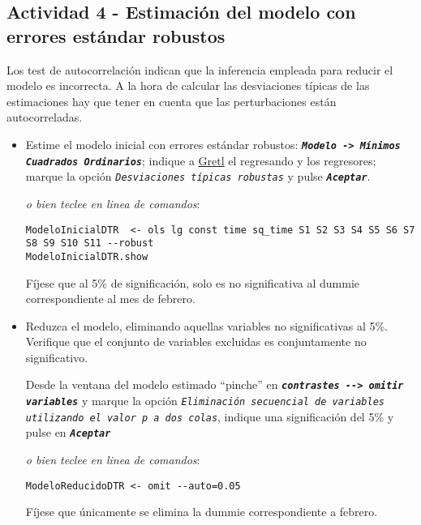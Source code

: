 \documentclass[11pt]{article}
\begin{document}
\subsection{Actividad 4 - Estimación del modelo con errores estándar robustos}
\label{sec:orge404a15}

Los test de autocorrelación indican que la inferencia empleada para
reducir el modelo es incorrecta. A la hora de calcular las
desviaciones típicas de las estimaciones hay que tener en cuenta que
las perturbaciones están autocorreladas.

\begin{itemize}
\item Estime el modelo inicial con errores estándar robustos: \textbf{\emph{\texttt{Modelo ->
  Mínimos Cuadrados Ordinarios}}}; indique a \href{https://gretl.sourceforge.net/es.html}{Gretl} el regresando y los
regresores; marque la opción \emph{\texttt{Desviaciones típicas robustas}} y
pulse \textbf{\emph{\texttt{Aceptar}}}.

{\vspace{1pt} \footnotesize \color{gray!70!black} \color{gray!70!black}
\emph{o bien teclee en linea de comandos}:
\begin{verbatim}
ModeloInicialDTR  <- ols lg const time sq_time S1 S2 S3 S4 S5 S6 S7 S8 S9 S10 S11 --robust
ModeloInicialDTR.show
\end{verbatim}
}

Fíjese que al 5\% de significación, solo es no significativa al
dummie correspondiente al mes de febrero.

\item Reduzca el modelo, eliminando aquellas variables no significativas
al 5\%. Verifique que el conjunto de variables excluidas es
conjuntamente no significativo.

Desde la ventana del modelo estimado ``pinche'' en \textbf{\emph{\texttt{contrastes -{}-{}>
  omitir variables}}} y marque la opción \emph{\texttt{Eliminación secuencial de
  variables utilizando el valor p a dos colas}}, indique una
significación del 5\% y pulse en \textbf{\emph{\texttt{Aceptar}}}
{\vspace{0pt} \footnotesize \color{gray!70!black}
\emph{o bien teclee en linea de comandos}:
\begin{verbatim}
ModeloReducidoDTR <- omit --auto=0.05
\end{verbatim}
}

Fíjese que únicamente se elimina la dummie correspondiente a
febrero.
\end{itemize}
\end{document}
